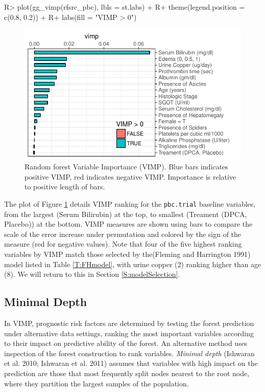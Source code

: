 \documentclass[article]{jss}
\begin{document}
\begin{Schunk}
\begin{Sinput}
R> plot(gg_vimp(rfsrc_pbc), lbls = st.labs) +
R+   theme(legend.position = c(0.8, 0.2)) +
R+   labs(fill = "VIMP > 0")
\end{Sinput}
\begin{figure}[!htb]

{\centering \includegraphics{fig-rfs/rfs-rf-vimp-1} 

}

\caption[Random forest Variable Importance (VIMP)]{Random forest Variable Importance (VIMP). Blue bars indicates positive VIMP, red indicates negative VIMP. Importance is relative to positive length of bars.}\label{fig:rf-vimp}
\end{figure}
\end{Schunk}

The  plot of Figure \ref{fig:rf-vimp} details VIMP ranking
for the \texttt{pbc.trial} baseline variables, from the largest (Serum
Bilirubin) at the top, to smallest (Treament (DPCA, Placebo)) at the
bottom. VIMP measures are shown using bars to compare the scale of the
error increase under permutation and colored by the sign of the measure
(red for negative values). Note that four of the five highest ranking
variables by VIMP match those selected by the(Fleming and Harrington
1991) model listed in Table \ref{T:FHmodel}, with urine copper (2)
ranking higher than age (8). We will return to this in Section
\ref{S:modelSelection}.

\subsection{Minimal Depth}\label{minimal-depth}

In VIMP, prognostic risk factors are determined by testing the forest
prediction under alternative data settings, ranking the most important
variables according to their impact on predictive ability of the forest.
An alternative method uses inspection of the forest construction to rank
variables. \emph{Minimal depth} (Ishwaran et al. 2010; Ishwaran et al.
2011) assumes that variables with high impact on the prediction are
those that most frequently split nodes nearest to the root node, where
they partition the largest samples of the population.
\end{document}
